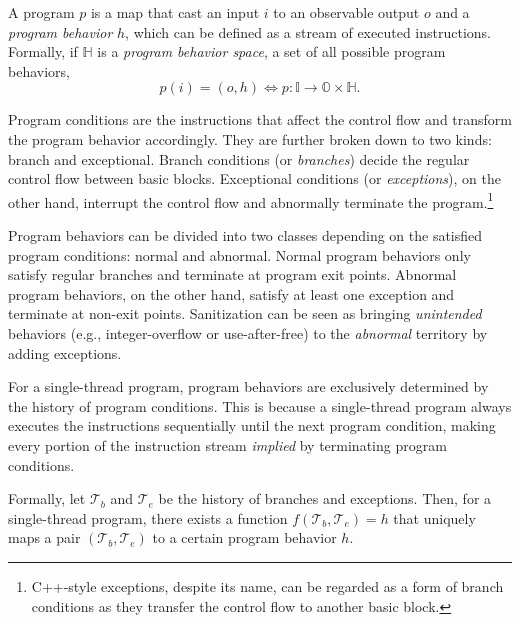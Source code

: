 \documentclass[letterpaper,twocolumn,10pt]{article}
\begin{document}
A program $p$ is a map that cast an input $i$ to an observable output $o$ and
a \emph{program behavior} $h$, which can be defined as a stream of executed
instructions. Formally, if $\mathbb{H}$ is a \emph{program behavior space}, 
a set of all possible program behaviors,
%
\begin{equation}
  p(i) = (o, h) \iff p: \mathbb{I} \rightarrow \mathbb{O} \times \mathbb{H}.
\end{equation}

%
Program conditions are the instructions that affect the control flow and
transform the program behavior accordingly. They are further
broken down to two kinds: branch and exceptional.
Branch conditions (or \emph{branches}) decide the regular control
flow between basic blocks. Exceptional conditions (or \emph{exceptions}), on the
other hand, interrupt the control flow and abnormally terminate the
program.\footnote{C++-style exceptions, despite its name, can be regarded as a
form of branch conditions as they transfer the control flow to another basic
block.} 

%
Program behaviors can be divided into two classes depending on the satisfied
program conditions: normal and abnormal. Normal program behaviors only satisfy
regular branches and terminate at program exit points. Abnormal
program behaviors, on the other hand, satisfy at least one exception and
terminate at non-exit points. Sanitization
\cite{yun2016apisan,serebryany2012asan,kasan,ktsan,kubsan,stepanov2015msan,ubsan} can be seen as bringing
\emph{unintended} behaviors (e.g., integer-overflow or use-after-free) to the
\emph{abnormal} territory by adding exceptions.

%
For a single-thread program, 
program behaviors are exclusively determined by the history of program
conditions. This is because a single-thread program always executes the 
instructions sequentially until the next program condition, making every
portion of the instruction stream \emph{implied} by terminating program
conditions.

Formally, let $\mathcal{T}_b$ and $\mathcal{T}_e$ be the history of branches and
exceptions. Then, for a single-thread program, there exists a function
$f(\mathcal{T}_b, \mathcal{T}_e) = h$ that uniquely maps a pair
$(\mathcal{T}_b, \mathcal{T}_e)$ to a certain program behavior $h$.
%
\end{document}
